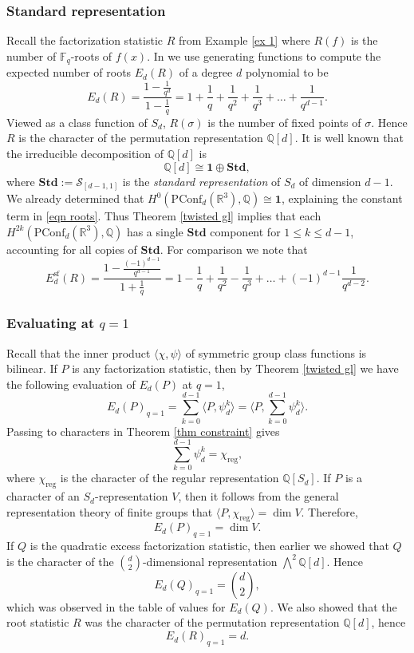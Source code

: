 \documentclass[submission]{FPSAC2018}
\theoremstyle{definition}
\numberwithin{equation}{section}
\def\QQ{\mathbb{Q}}
\def\FF{\mathbb{F}}
\def\RR{\mathbb{R}}
\newcommand\PConf{\mathrm{PConf}}
\newcommand{\sfr}{\mathrm{sf}}
\newcommand{\Sp}{\mathcal{S}}
\newcommand{\tr}{\mathbf{1}}
\newcommand{\Std}{\mathbf{Std}}
\begin{document}
\subsubsection{Standard representation}
Recall the factorization statistic $R$ from Example \ref{ex 1} where $R(f)$ is the number of $\FF_q$-roots of $f(x)$. In \cite{Hyde1} we use generating functions to compute the expected number of roots $E_d(R)$ of a degree $d$ polynomial to be
\begin{equation}
\label{eqn roots}
    E_d(R) = \frac{1 - \frac{1}{q^d}}{1 - \frac{1}{q}} = 1 + \frac{1}{q} + \frac{1}{q^2} + \frac{1}{q^3} + \ldots + \frac{1}{q^{d-1}}.
\end{equation}
Viewed as a class function of $S_d$, $R(\sigma)$ is the number of fixed points of $\sigma$. Hence $R$ is the character of the permutation representation $\QQ[d]$. It is well known that the irreducible decomposition of $\QQ[d]$ is
\[
    \QQ[d] \cong \tr \oplus \Std,
\]
where $\Std := \Sp_{[d-1,1]}$ is the \emph{standard representation} of $S_d$ of dimension $d - 1$. We already determined that $H^0(\PConf_d(\RR^3),\QQ)\cong \tr$, explaining the constant term in \eqref{eqn roots}. Thus Theorem \ref{twisted gl} implies that each $H^{2k}(\PConf_d(\RR^3),\QQ)$ has a single $\Std$ component for $1\leq k \leq d - 1$, accounting for all copies of $\Std$. For comparison we note that
\[
    E_d^\sfr(R) = \frac{1 - \frac{(-1)^{d-1}}{q^{d-1}}}{1 + \frac{1}{q}} = 1 - \frac{1}{q} + \frac{1}{q^2} - \frac{1}{q^3} + \ldots + (-1)^{d-1}\frac{1}{q^{d-2}}. 
\]

\subsubsection{Evaluating at $q = 1$}

Recall that the inner product $\langle \chi, \psi \rangle$ of symmetric group class functions is bilinear. If $P$ is any factorization statistic, then by Theorem \ref{twisted gl} we have the following evaluation of $E_d(P)$ at $q = 1$,
\[
    E_d(P)_{q = 1} = \sum_{k=0}^{d-1} \langle P, \psi_d^k\rangle = \langle P, \sum_{k=0}^{d-1} \psi_d^k \rangle.
\]
Passing to characters in Theorem \ref{thm constraint} gives
\[
    \sum_{k=0}^{d-1} \psi_d^k = \chi_{\mathrm{reg}},
\]
where $\chi_{\mathrm{reg}}$ is the character of the regular representation $\QQ[S_d]$. If $P$ is a character of an $S_d$-representation $V$, then it follows from the general representation theory of finite groups that $\langle P, \chi_{\mathrm{reg}} \rangle = \dim V$. Therefore,
\[
    E_d(P)_{q = 1} = \dim V.
\]
If $Q$ is the quadratic excess factorization statistic, then earlier we showed that $Q$ is the character of the $\binom{d}{2}$-dimensional representation $\bigwedge^2 \QQ[d]$. Hence
\[
    E_d(Q)_{q=1} = \binom{d}{2},
\]
which was observed in the table of values for $E_d(Q)$. We also showed that the root statistic $R$ was the character of the permutation representation $\QQ[d]$, hence
\[
    E_d(R)_{q=1} = d.
\]


\printbibliography
\end{document}
